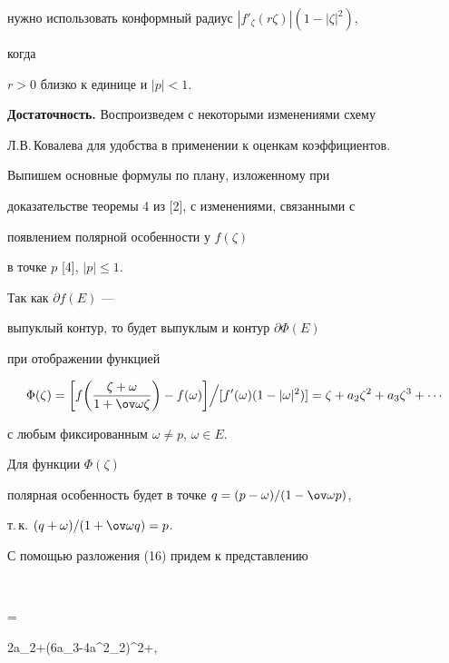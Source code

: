 нужно использовать конформный радиус $|f'_\zeta(r\zeta)|(1-|\zeta|^2)$, 


когда 


$r>0$ близко к единице и $|p|<1$. 


\medskip 


 


{\bf Достаточность.} Воспроизведем с некоторыми изменениями схему 


Л.В.\,Ковалева для удобства в применении к оценкам коэффициентов. 


 


Выпишем основные формулы по плану, изложенному при 


доказательстве теоремы 4 из [2], с изменениями, связанными с 


появлением полярной особенности у $f(\zeta)$ 


в точке $p$ [4], $|p|\le1$. 


 


Так как $\partial f(E)$ --- 


выпуклый контур, то будет выпуклым и контур $\partial\Phi(E)$ 


при отображении функцией 


\begin{equation} 


\Phi(\zeta)=\bigg[f\bigg(\frac{\zeta+\omega} 


{1+\ov\omega\zeta}\bigg)-f(\omega)\bigg]\Big/  


[f'(\omega)(1-|\omega|^2)]=\zeta+a_2\zeta^2+ 


a_3\zeta^3+\dotsb 


\end{equation} 


с любым фиксированным $\omega\ne p$, $\omega\in E$. 


Для функции $\Phi(\zeta)$ 


полярная особенность будет в точке $q=(p-\omega)/(1-\ov\omega p)$, 


т.\,к. $(q+\omega)/(1+\ov\omega q)=p$. 


 


С помощью разложения (16) придем к представлению 


$$ 


\zeta{}= 


2a_2\zeta+(6a_3-4a^2_2)\zeta^2+\dotsb, 


